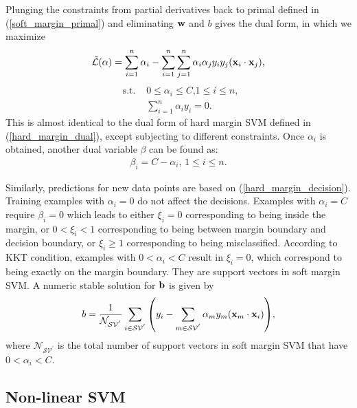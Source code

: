 \documentclass[english]{tktltiki}
\newcommand{\Ncal}{\mathcal{N}} %
\newcommand{\Lcal}{\mathcal{L}}
\newcommand{\xb}{{\bf x}}
\newcommand{\wb}{{\bf w}}
\newcommand{\bb}{{\bf b}}
\newcommand{\valpha}{\mathbf{\alpha}}
\newcommand{\SVcal}{\mathcal{SV}}
\begin{document}

Plunging the constraints from partial derivatives back to primal defined in (\ref{soft_margin_primal}) and eliminating $\wb$ and $b$ gives the dual form, in which we maximize
\begin{align}
\tilde{\Lcal}(\valpha) = \sum_{i=1}^{n}{\alpha_i} - \sum_{i = 1}^{n}\sum_{j = 1}^{n}{\alpha_i \alpha_j y_i y_j (\xb_i \cdot \xb_j)} \text{,}
\label{soft_margin_dual}
\end{align}
\begin{align*}
\text{ s.t. } & 0 \leq \alpha_i \leq C \text{,} 1 \leq i \leq n \text{,}\\
 & \sum_{i = 1}^{n}{\alpha_i y_i} = 0 \text{.}
\end{align*}
This is almost identical to the dual form of hard margin SVM defined in (\ref{hard_margin_dual}), except subjecting to different constraints. Once $\alpha_i$ is obtained, another dual variable $\beta$ can be found as:
\begin{align*}
\beta_i = C-\alpha_i \text{, }  1 \leq i \leq n \text{.}
\end{align*}


Similarly, predictions for new data points are based on (\ref{hard_margin_decision}). Training examples with $\alpha_i = 0$ do not affect the decisions. Examples with $\alpha_i = C$ require $\beta_i = 0$ which leads to either $\xi_i = 0$ corresponding to being inside the margin, or $0<\xi_i<1$ corresponding to being between margin boundary and decision boundary, or $\xi_i \ge 1$ corresponding to being misclassified. According to KKT condition, examples with $0<\alpha_i<C$ result in $\xi_i =0$, which correspond to being exactly on the margin boundary. They are support vectors in soft margin SVM. A numeric stable solution for $\bb$ is given by
\begin{align*}
b = \frac{1}{\Ncal_{\SVcal^{'}}}\sum_{i \in \SVcal^{'}}{\left(y_i - \sum_{m \in \SVcal^{'}}{\alpha_m y_m (\xb_m \cdot \xb_i)}\right)},
\end{align*}
where $\Ncal_{\SVcal^{'}}$ is the total number of support vectors in soft margin SVM that have $0<\alpha_i<C$.


\subsection{Non-linear SVM}

\end{document}
